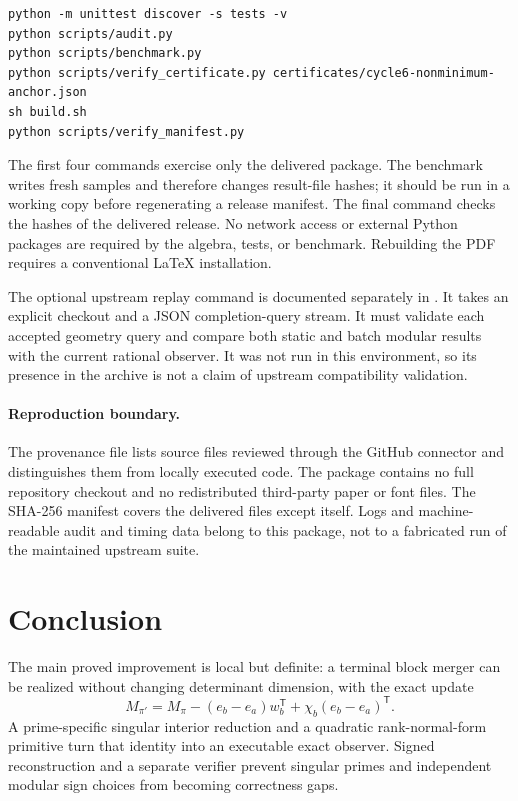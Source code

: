 \documentclass[11pt,letterpaper]{article}
\theoremstyle{definition}\newtheorem{definition}[theorem]{Definition}
\theoremstyle{remark}\newtheorem{remark}[theorem]{Remark}
\newcommand{\code}[1]{\texttt{\detokenize{#1}}}
\newcommand{\trans}{^{\mathsf T}}
\begin{document}
\begin{lstlisting}
python -m unittest discover -s tests -v
python scripts/audit.py
python scripts/benchmark.py
python scripts/verify_certificate.py certificates/cycle6-nonminimum-anchor.json
sh build.sh
python scripts/verify_manifest.py
\end{lstlisting}

The first four commands exercise only the delivered package. The benchmark writes fresh samples and therefore changes result-file hashes; it should be run in a working copy before regenerating a release manifest. The final command checks the hashes of the delivered release. No network access or external Python packages are required by the algebra, tests, or benchmark. Rebuilding the PDF requires a conventional LaTeX installation.

The optional upstream replay command is documented separately in \code{integration/README.md}. It takes an explicit checkout and a JSON completion-query stream. It must validate each accepted geometry query and compare both static and batch modular results with the current rational observer. It was not run in this environment, so its presence in the archive is not a claim of upstream compatibility validation.

\paragraph{Reproduction boundary.}
The provenance file lists source files reviewed through the GitHub connector and distinguishes them from locally executed code. The package contains no full repository checkout and no redistributed third-party paper or font files. The SHA-256 manifest covers the delivered files except itself. Logs and machine-readable audit and timing data belong to this package, not to a fabricated run of the maintained upstream suite.

\section{Conclusion}
The main proved improvement is local but definite: a terminal block merger can be realized without changing determinant dimension, with the exact update
\[
 M_{\pi'}=M_\pi-(e_b-e_a)w_b\trans+\chi_b(e_b-e_a)\trans.
\]
A prime-specific singular interior reduction and a quadratic rank-normal-form primitive turn that identity into an executable exact observer. Signed reconstruction and a separate verifier prevent singular primes and independent modular sign choices from becoming correctness gaps.
\end{document}
